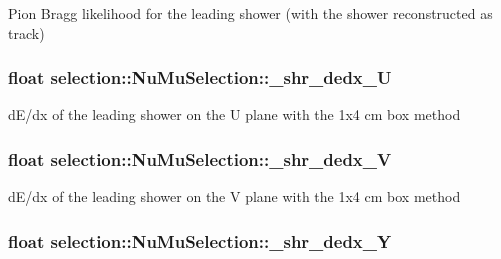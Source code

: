 Pion Bragg likelihood for the leading shower (with the shower reconstructed as track) \hypertarget{classselection_1_1NuMuSelection_a208bf1de9d20aa592d340dd331d6a524}{
\subsubsection[{\-\_\-shr\-\_\-dedx\-\_\-\-U}]{\setlength{\rightskip}{0pt plus 5cm}float selection\-::\-Nu\-Mu\-Selection\-::\-\_\-shr\-\_\-dedx\-\_\-\-U\hspace{0.3cm}{\ttfamily [private]}}}\label{classselection_1_1NuMuSelection_a208bf1de9d20aa592d340dd331d6a524}
d\-E/dx of the leading shower on the U plane with the 1x4 cm box method \hypertarget{classselection_1_1NuMuSelection_a779a5d2a981609620e58ecb9cc476757}{
\subsubsection[{\-\_\-shr\-\_\-dedx\-\_\-\-V}]{\setlength{\rightskip}{0pt plus 5cm}float selection\-::\-Nu\-Mu\-Selection\-::\-\_\-shr\-\_\-dedx\-\_\-\-V\hspace{0.3cm}{\ttfamily [private]}}}\label{classselection_1_1NuMuSelection_a779a5d2a981609620e58ecb9cc476757}
d\-E/dx of the leading shower on the V plane with the 1x4 cm box method \hypertarget{classselection_1_1NuMuSelection_a94dda0e5c78c02e5787f00ded787f7ab}{
\subsubsection[{\-\_\-shr\-\_\-dedx\-\_\-\-Y}]{\setlength{\rightskip}{0pt plus 5cm}float selection\-::\-Nu\-Mu\-Selection\-::\-\_\-shr\-\_\-dedx\-\_\-\-Y\hspace{0.3cm}{\ttfamily [private]}}}\label{classselection_1_1NuMuSelection_a94dda0e5c78c02e5787f00ded787f7ab}
